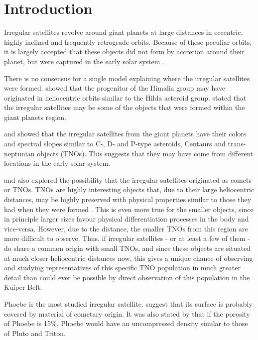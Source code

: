 \section{Introduction}\label{Sec: introducao}

Irregular satellites revolve around giant planets at large distances in eccentric, highly inclined and frequently retrograde orbits. Because of these peculiar orbits, it is largely accepted that these objects did not form by accretion around their planet, but were captured in the early solar system \citep{Sheppard2005}.

There is no consensus for a single model explaining where the irregular satellites were formed. \cite{Cuk2004} showed that the progenitor of the Himalia group may have originated in heliocentric orbits similar to the Hilda asteroid group. \cite{Sheppard2005} stated that the irregular satellites may be some of the objects that were formed within the giant planets region.

\cite{Grav2003} and \cite{Grav2007} showed that the irregular satellites from the giant planets have their colors and spectral slopes similar to C-, D- and P-type asteroids, Centaurs and trans-neptunian objects (TNOs). This suggests that they may have come from different locations in the early solar system.

\cite{Sheppard2005} and \cite{Jewitt2007} also explored the possibility that the irregular satellites originated as comets or TNOs. TNOs are highly interesting objects that, due to their large heliocentric distances, may be highly preserved with physical properties similar to those they had when they were formed \citep{Barucci2008}. This is even more true for the smaller objects, since in principle larger sizes favour physical differentiation processes in the body and vice-versa. However, due to the distance, the smaller TNOs from this region are more difficult to observe. Thus, if irregular satellites - or at least a few of them - do share a common origin with small TNOs, and since these objects are situated at much closer heliocentric distances now, this gives a unique chance of observing and studying representatives of this specific TNO population in much greater detail than could ever be possible by direct observation of this population in the Kuiper Belt. 

Phoebe is the most studied irregular satellite. \cite{Clark2005} suggest that its surface is probably covered by material of cometary origin. It was also stated by \cite{Johnson2005} that if the porosity of Phoebe is 15\%, Phoebe would have an uncompressed density similar to those of Pluto and Triton.

